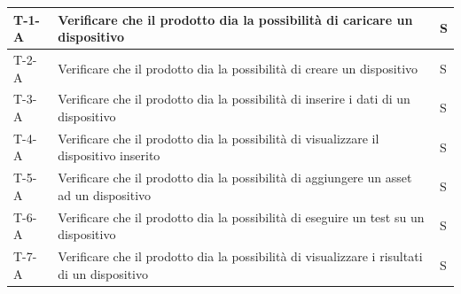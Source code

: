 \documentclass[a4paper,12pt]{article}
\begin{document}
{{\begin{longtable}{|l|p{}|p{}|}
            \hline
            \endlastfoot
            \hline
            T-1-A & Verificare che il prodotto dia la possibilità di caricare un dispositivo & S \\
            \hline
            T-2-A & Verificare che il prodotto dia la possibilità di creare un dispositivo & S \\
            \hline
            T-3-A & Verificare che il prodotto dia la possibilità di inserire i dati di un dispositivo & S \\
            \hline
            T-4-A & Verificare che il prodotto dia la possibilità di visualizzare il dispositivo inserito & S \\
            \hline
            T-5-A & Verificare che il prodotto dia la possibilità di aggiungere un asset ad un dispositivo & S \\
            \hline
            T-6-A & Verificare che il prodotto dia la possibilità di eseguire un test su un dispositivo & S \\
            \hline
            T-7-A & Verificare che il prodotto dia la possibilità di visualizzare i risultati di un dispositivo & S \\
        \end{longtable}

    }

}
    
\newpage
\end{document}
